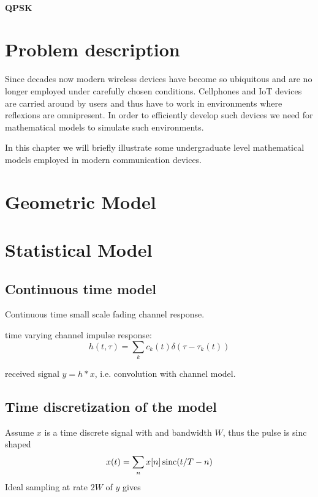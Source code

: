 \paragraph{QPSK}

\section{Problem description}

Since decades now modern wireless devices have become so ubiquitous and are no longer employed under carefully chosen conditions. Cellphones and IoT devices are carried around by users and thus have to work in environments where reflexions are omnipresent. In order to efficiently develop such devices we need for mathematical models to simulate such environments.

In this chapter we will briefly illustrate some undergraduate level mathematical models employed in modern communication devices.

\section{Geometric Model}

\section{Statistical Model}


\subsection{Continuous time model}

Continuous time small scale fading channel response. \cite{Alimohammad2009}

time varying channel impulse response:
\begin{equation}
	h(t, \tau) = \sum_k c_k (t) \delta(\tau - \tau_k(t))
\end{equation}

received signal \(y = h * x\), i.e. convolution with channel model. 

\subsection{Time discretization of the model}


Assume \(x\) is a time discrete signal with and bandwidth \(W\), thus the pulse is sinc shaped
\begin{equation}
	x(t) = \sum_n x[n] \operatorname{sinc}(t/T - n)
\end{equation}
Ideal sampling at rate \(2W\) of \(y\) gives
